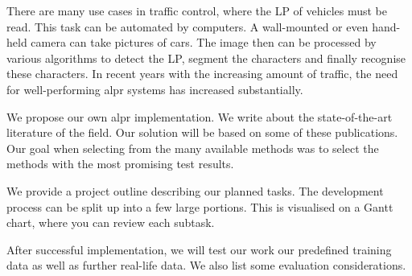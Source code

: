 
There are many use cases in traffic control, where the \ac{LP} of vehicles must
be read.  This task can be automated by computers. A wall-mounted or even
hand-held camera can take pictures of cars. The image then can be processed by
various algorithms to detect the \ac{LP}, segment the characters and finally
recognise these characters.  In recent years with the increasing amount of
traffic, the need for well-performing \ac{alpr} systems has increased
substantially.

We propose our own \ac{alpr} implementation.  We write about the
state-of-the-art literature of the field. Our solution will be based on some of
these publications. Our goal when selecting from the many available methods was
to select the methods with the most promising test results.

We provide a project outline describing our planned tasks. The development
process can be split up into a few large portions. This is visualised on a Gantt
chart, where you can review each subtask.

After successful implementation, we will test our work our predefined training
data as well as further real-life data. We also list some evaluation
considerations.
